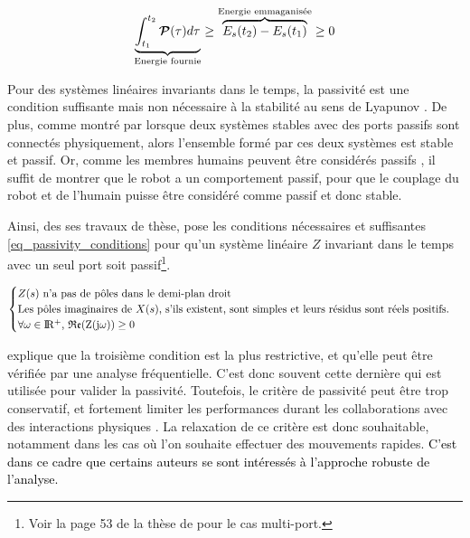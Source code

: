 \begin{equation} \label{eq_passivity_energy}
	\underbrace{\int_{t_1}^{t_2} \matrCal{P}(\tau) d\tau}_\text{Energie fournie} \geq \overbrace{E_s(t_2) - E_s(t_1)}^\text{Energie emmaganisée} \geq 0 %
\end{equation}

Pour des systèmes linéaires invariants dans le temps, la passivité est une condition suffisante mais non nécessaire à la stabilité au sens de Lyapunov \parencite{niemeyer_telerobotics_2008}. De plus, comme montré par \textcite{colgate_robust_1988} lorsque deux systèmes stables avec des ports passifs sont connectés physiquement, alors l'ensemble formé par ces deux systèmes est stable et passif. Or, comme les membres humains peuvent être considérés passifs \parencite{lamy_conception_2011,hogan_controlling_1989}, il suffit de montrer que le robot a un comportement passif, pour que le couplage du robot et de l'humain puisse être considéré comme passif et donc stable.

Ainsi, des ses travaux de thèse, \textcite[Chapitre~2, p.~52,53]{colgate_control_1988} pose les conditions nécessaires et suffisantes \cref{eq_passivity_conditions} pour qu'un système linéaire $Z$ invariant dans le temps avec un seul port soit passif\footnote{Voir la page 53 de la thèse de \textcite{colgate_control_1988} pour le cas multi-port.}. %

\begin{equation}\label{eq_passivity_conditions}
	\begin{cases}
		Z(s)\text{ n'a pas de pôles dans le demi-plan droit}\\ 
		\text{Les pôles imaginaires de }X(s)\text{, s’ils existent, sont simples et leurs résidus sont réels
		positifs.}\\
		\forall \omega \in \rm I\!R^+\text{, } \mathfrak{Re}(Z(j\omega)) \geq 0
	\end{cases}
\end{equation}

\textcite{lamy_conception_2011} explique que la troisième condition est la plus restrictive, et qu'elle peut être vérifiée par une analyse fréquentielle. C'est donc souvent cette dernière qui est utilisée pour valider la passivité. Toutefois, le critère de passivité peut être trop conservatif, et fortement limiter les performances durant les collaborations avec des interactions physiques \parencite{buerger_relaxing_2006,duchaine_investigation_2008}. La relaxation de ce critère est donc souhaitable, notamment dans les cas où l'on souhaite effectuer des mouvements rapides. \textcolor{black}{C'est dans ce cadre que certains auteurs se sont intéressés à l'approche robuste de l'analyse.}

